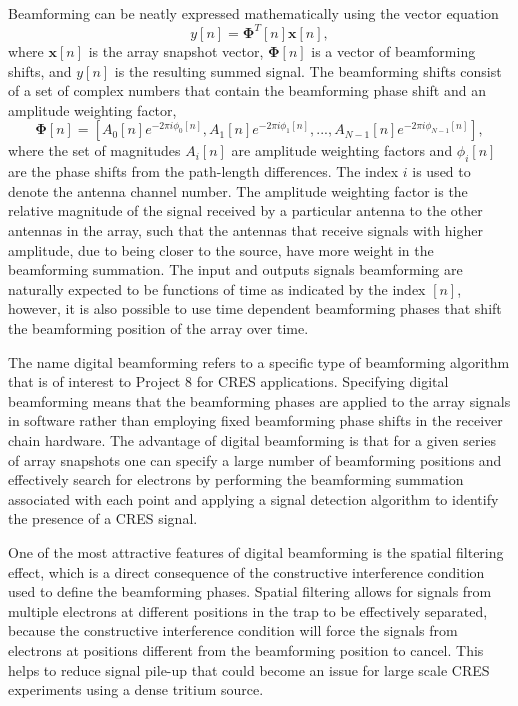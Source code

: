 Beamforming can be neatly expressed mathematically using the vector equation
\begin{equation}
    y[n] = \bm{\Phi}^T[n]\bm{x}[n],
\end{equation}
where $\bm{x}[n]$ is the array snapshot vector, $\bm{\Phi}[n]$ is a vector of beamforming shifts, and $y[n]$ is the resulting summed signal. The beamforming shifts consist of a set of complex numbers that contain the beamforming phase shift and an amplitude weighting factor,
\begin{equation}
    \bm{\Phi}[n] = \left[A_0[n]e^{-2\pi i\phi_0[n]}, A_1[n]e^{-2\pi i \phi_1[n]}, ..., A_{N-1}[n]e^{-2\pi i \phi_{N-1}[n]}\right],
\end{equation}
where the set of magnitudes $A_i[n]$ are amplitude weighting factors and $\phi_i[n]$ are the phase shifts from the path-length differences. The index $i$ is used to denote the antenna channel number. The amplitude weighting factor is the relative magnitude of the signal received by a particular antenna to the other antennas in the array, such that the antennas that receive signals with higher amplitude, due to being closer to the source, have more weight in the beamforming summation. The input and outputs signals beamforming are naturally expected to be functions of time as indicated by the index $[n]$, however, it is also possible to use time dependent beamforming phases that shift the beamforming position of the array over time.

The name digital beamforming refers to a specific type of beamforming algorithm that is of interest to Project 8 for CRES applications. Specifying digital beamforming means that the beamforming phases are applied to the array signals in software rather than employing fixed beamforming phase shifts in the receiver chain hardware. The advantage of digital beamforming is that for a given series of array snapshots one can specify a large number of beamforming positions and effectively search for electrons by performing the beamforming summation associated with each point and applying a signal detection algorithm to identify the presence of a CRES signal. 

One of the most attractive features of digital beamforming is the spatial filtering effect, which is a direct consequence of the constructive interference condition used to define the beamforming phases. Spatial filtering allows for signals from multiple electrons at different positions in the trap to be effectively separated, because the constructive interference condition will force the signals from electrons at positions different from the beamforming position to cancel. This helps to reduce signal pile-up that could become an issue for large scale CRES experiments using a dense tritium source.

